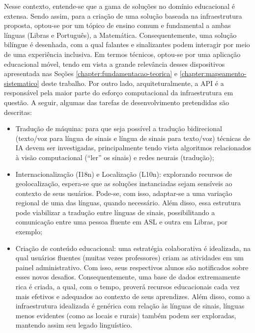 Nesse contexto, entende-se que a gama de soluções no domínio educacional é extensa. Sendo assim, para a criação de uma solução baseada na infraestrutura proposta, optou-se por um tópico de ensino comum e fundamental a ambas línguas (Libras e Português), a Matemática. Consequentemente, uma solução bilíngue é desenhada, com a qual falantes e sinalizantes podem interagir por meio de uma experiência inclusiva. Em termos técnicos, optou-se por uma aplicação educacional móvel, tendo em vista a grande relevância desses dispositivos apresentada nas Seções \ref{chapter:fundamentacao-teorica} e \ref{chapter:mapeamento-sistematico} deste trabalho. Por outro lado, arquiteturalmente, a API é a responsável pela maior parte do esforço computacional da infraestrutura em questão. A seguir, algumas das tarefas de desenvolvimento pretendidas são descritas:  %

\begin{itemize}
    \item Tradução de máquina: para que seja possível a tradução bidirecional (texto/voz para língua de sinais e língua de sinais para texto/voz) técnicas de IA devem ser investigadas, principalmente tendo vista algoritmos relacionados à visão computacional (``ler'' os sinais) e redes neurais (tradução);
    \item Internacionalização (I18n) e Localização (L10n): explorando recursos de geolocalização, espera-se que as soluções instanciadas sejam sensíveis ao contexto de seus usuários. Pode-se, com isso, adaptar-se a uma variação regional de uma das línguas, quando necessário. Além disso, essa estrutura pode viabilizar a tradução entre línguas de sinais, possibilitando a comunicação entre uma pessoa fluente em ASL e outra em Libras, por exemplo;
    \item Criação de conteúdo educacional: uma estratégia colaborativa é idealizada, na qual usuários fluentes (muitas vezes professores) criam as atividades em um painel administrativo. Com isso, seus respectivos alunos são notificados sobre esses novos desafios. Consequentemente, uma base de dados extremamente rica é criada, a qual, com o tempo, proverá recursos educacionais cada vez mais efetivos e adequados ao contexto de seus aprendizes. Além disso, como a infraestrutura idealizada é genérica com relação às línguas de sinais, línguas menos evidentes (como as locais e rurais) também podem ser exploradas, mantendo assim seu legado linguístico. %
\end{itemize}

